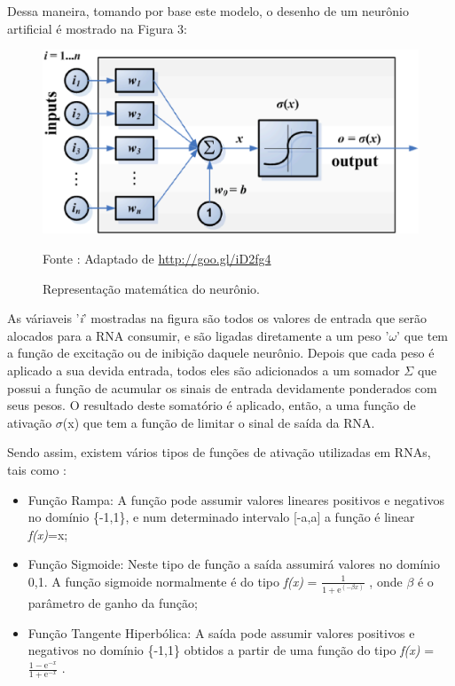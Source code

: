     Dessa maneira, tomando por base este modelo, o desenho de um neurônio artificial é mostrado na Figura 3:

    \begin{figure}[ht]
        \centering
        \label{fig03}
            \includegraphics[keepaspectratio=true, scale=0.27]{editaveis/images/modeloNeuronio.eps}
        \caption{Representação matemática do neurônio.}
        Fonte : Adaptado de \url{http://goo.gl/iD2fg4}
    \end{figure}
    \newpage

    As váriaveis '\textit{i}' mostradas na figura são todos os valores de entrada que serão alocados para a RNA consumir, e são ligadas diretamente a um peso '$\omega$' que tem a função de excitação ou de inibição daquele neurônio.
    Depois que cada peso é aplicado a sua devida entrada, todos eles são adicionados a um somador $\Sigma$ que possui a função de acumular os sinais de entrada devidamente ponderados com seus pesos. O resultado deste somatório é aplicado, então, a uma função de ativação $\sigma$(x) que tem a função de limitar o sinal de saída da RNA.

    Sendo assim, existem vários tipos de funções de ativação utilizadas em RNAs, tais como \cite{Distractions2016}:

    \begin{itemize}
        \item Função Rampa: A função pode assumir valores lineares positivos e negativos no domínio \{-1,1\}, e num determinado intervalo [-a,a] a função é linear \textit{f(x)}=x;
        \item Função Sigmoide: Neste tipo de função a saída assumirá valores no domínio {0,1}. A função sigmoide normalmente é do tipo \textit{f(x)} = $\frac{1}{1+\mathrm{e}^{(-\beta \textit{x})}}$ , onde $\beta$ é o parâmetro de ganho da função;
        \item Função Tangente Hiperbólica: A saída pode assumir valores positivos e negativos no domínio \{-1,1\} obtidos a partir de uma função do tipo \textit{f(x)} = $\frac{1-\mathrm{e}^{-\textit{x}}}{1+\mathrm{e}^{-\textit{x}}}$ .
    \end{itemize}

